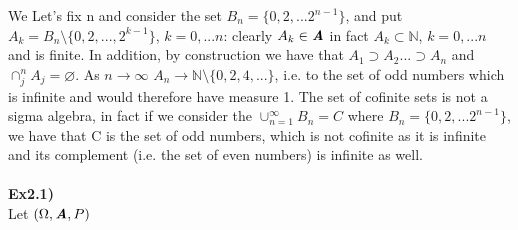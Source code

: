 \documentclass[12pt,mythesisstyle]{report}
\begin{document}
We Let's fix n and consider the set \(B_n=\{0,2,...2^{n-1}\}\), and put \(A_k=B_n\setminus\{0,2,...,2^{k-1}\}\), \(k=0,...n\): clearly \(A_k\in\textbf{\textit{A}}\) in fact \(A_k\subset\mathbb{N}\), \(k=0,...n\) and is finite. In addition, by construction we have that \(A_1\supset A_2...\supset A_n\) and $\cap_{j}^n A_j=\varnothing$. As \(n\rightarrow\infty\) $A_n\rightarrow\mathbb{N}\setminus\{0,2,4,...\}$, i.e. to the set of odd numbers which is infinite and would therefore have measure 1. The set of cofinite sets is not a sigma algebra, in fact if we consider the \(\cup_{n=1}^\infty B_n=C\) where $B_n=\{0,2,...2^{n-1}\}$, we have that C is the set of odd numbers, which is not cofinite as it is infinite and its complement (i.e. the set of even numbers) is infinite as well.
\\\\
\textbf{Ex2.1)}\\
Let $(\Omega, \textbf{\textit{A}}, P)$
\end{document}
